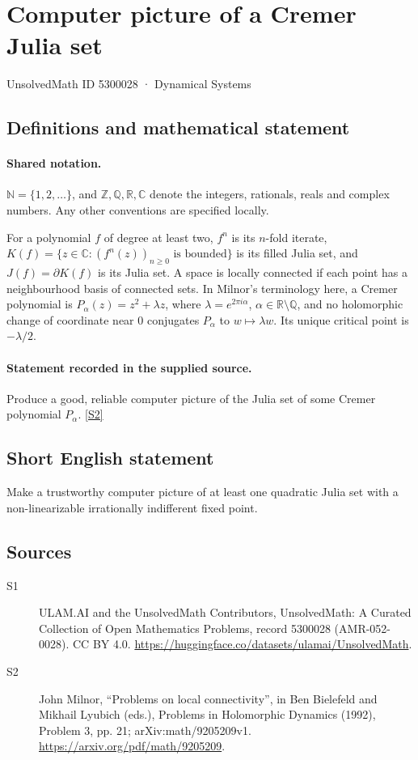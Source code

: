 \documentclass[11pt]{article}
\newcommand{\sref}[2]{\hyperlink{source:#1:#2}{[S#2]}}
\begin{document}
\setcounter{section}{5300027}
\section{Computer picture of a Cremer Julia set}\label{5300028}
{\small\sffamily UnsolvedMath ID 5300028 · Dynamical Systems}
\subsection{Definitions and mathematical statement}

\paragraph{Shared notation.}$\mathbb N=\{1,2,\ldots\}$, and $\mathbb Z,\mathbb Q,\mathbb R,\mathbb C$ denote the integers, rationals, reals and complex numbers. Any other conventions are specified locally.


For a polynomial $f$ of degree at least two, $f^n$ is its $n$-fold iterate, $K(f)=\{z\in\mathbb C:(f^n(z))_{n\geq0}\text{ is bounded}\}$ is its filled Julia set, and $J(f)=\partial K(f)$ is its Julia set. A space is locally connected if each point has a neighbourhood basis of connected sets. In Milnor's terminology here, a Cremer polynomial is $P_\alpha(z)=z^2+\lambda z$, where $\lambda=e^{2\pi i\alpha}$, $\alpha\in\mathbb R\setminus\mathbb Q$, and no holomorphic change of coordinate near $0$ conjugates $P_\alpha$ to $w\mapsto\lambda w$. Its unique critical point is $-\lambda/2$.
\paragraph{Statement recorded in the supplied source.}
Produce a good, reliable computer picture of the Julia set of some Cremer polynomial $P_\alpha$. \sref{5300028}{2}
\subsection{Short English statement}
Make a trustworthy computer picture of at least one quadratic Julia set with a non-linearizable irrationally indifferent fixed point.
\subsection{Sources}
\begin{description}
\item[\hypertarget{source:5300028:1}{S1}] ULAM.AI and the UnsolvedMath Contributors, UnsolvedMath: A Curated Collection of Open Mathematics Problems, record 5300028 (AMR-052-0028). CC BY 4.0. \url{https://huggingface.co/datasets/ulamai/UnsolvedMath}.
\item[\hypertarget{source:5300028:2}{S2}] John Milnor, ``Problems on local connectivity'', in Ben Bielefeld and Mikhail Lyubich (eds.), Problems in Holomorphic Dynamics (1992), Problem 3, pp. 21; arXiv:math/9205209v1. \url{https://arxiv.org/pdf/math/9205209}.
\end{description}
\label{end:5300028}
\end{document}
